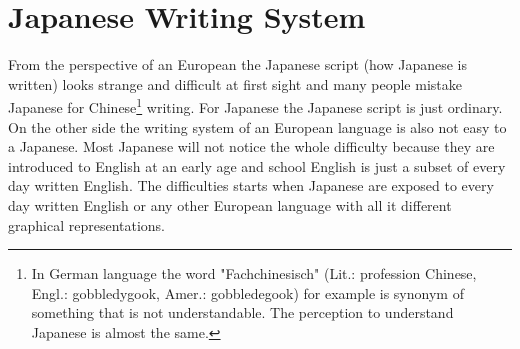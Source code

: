 
\chapter{Japanese Writing System}
\label{chap:JapaneseWritingSystem}

\newcommand{\lhiragana}{\ivoc{hiragana}{平仮名}{ひらがな}{Hiragana}}
\newcommand{\lkatakana}{\ivoc{katakana}{片仮名}{かたかな}{Katakana}}

 From the perspective
of an European the Japanese script (how Japanese is written) looks strange and
difficult at first sight and many people mistake Japanese for
Chinese\footnote{In German language the word "Fachchinesisch" (Lit.: profession
Chinese, Engl.: gobbledygook, Amer.: gobbledegook) for example is synonym of
something that is not understandable. The perception to understand Japanese is
almost the same.} writing. For Japanese the Japanese script is just ordinary.
On the other side the writing system of an European language is also not easy
to a Japanese. Most Japanese will not notice the whole difficulty because they
are introduced to English at an early age and school English is just a subset
of every day written English. The difficulties starts when Japanese are exposed
to every day written English or any other European language with all it
different graphical representations.

